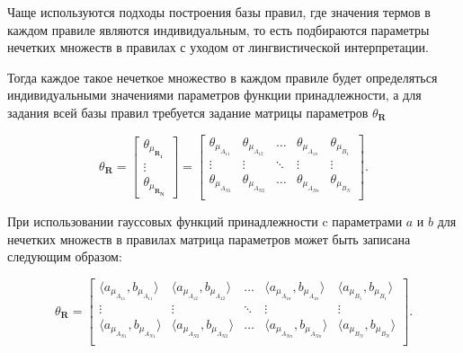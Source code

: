 

Чаще используются подходы построения базы правил, где значения термов в каждом правиле являются индивидуальным, то есть подбираются параметры нечетких множеств в правилах с уходом от лингвистической интерпретации.

Тогда каждое такое нечеткое множество в каждом правиле будет определяться индивидуальными значениями параметров функции принадлежности, а для задания всей базы правил требуется задание матрицы параметров $\theta_{\mathbf{R}}$

\begin{equation*}
	\theta_{\mathbf{R}} = \begin{bmatrix}
		\theta_{\mu_{\mathbf{R_1}}}\\
		\vdots\\
		\theta_{\mu_{\mathbf{R_N}}}
	\end{bmatrix} = \begin{bmatrix}
		\theta_{\mu_{A_{11}}} & \theta_{\mu_{A_{12}}} & \dots & \theta_{\mu_{A_{1n}}} & \theta_{\mu_{B_{1}}} \\
		\vdots & \vdots & \ddots & \vdots & \vdots \\
		\theta_{\mu_{A_{N1}}} & \theta_{\mu_{A_{N2}}} & \dots & \theta_{\mu_{A_{Nn}}} & \theta_{\mu_{B_{N}}} \\
	\end{bmatrix}.
\end{equation*}

При использовании гауссовых функций принадлежности c параметрами $a$ и $b$ для нечетких множеств в правилах матрица параметров может быть записана следующим образом:

\begin{equation*}
	\theta_{\mathbf{R}} = \begin{bmatrix}
		\langle a_{\mu_{A_{11}}}, b_{\mu_{A_{11}}}\rangle & \langle a_{\mu_{A_{12}}}, b_{\mu_{A_{12}}}\rangle & \dots & \langle a_{\mu_{A_{1n}}}, b_{\mu_{A_{1n}}}\rangle & \langle a_{\mu_{B_{1}}}, b_{\mu_{B_{1}}}\rangle \\
		\vdots & \vdots & \ddots & \vdots & \vdots \\
		\langle a_{\mu_{A_{N1}}}, b_{\mu_{A_{N1}}}\rangle & \langle a_{\mu_{A_{N2}}}, b_{\mu_{A_{N2}}}\rangle & \dots & \langle a_{\mu_{A_{Nn}}}, b_{\mu_{A_{Nn}}}\rangle & \langle a_{\mu_{B_{N}}}, b_{\mu_{B_{N}}}\rangle \\
	\end{bmatrix}.
\end{equation*}

